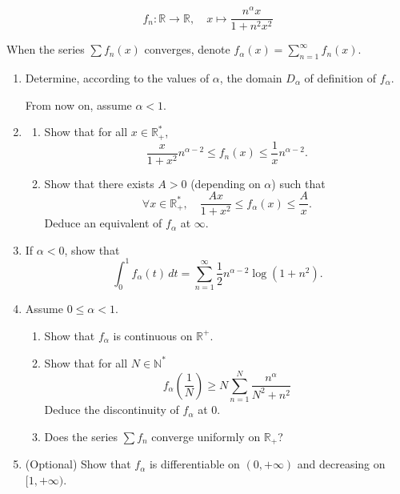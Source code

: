 \documentclass[12pt]{article}
\begin{document}
\[
f_n : \mathbb{R} \longrightarrow \mathbb{R}, \quad x \mapsto \frac{n^\alpha x}{1 + n^{2} x^2}
\]

When the series \( \sum f_n(x) \) converges, denote \( f_\alpha(x) = \sum_{n=1}^{\infty} f_n(x) \).

\begin{enumerate}
    \item Determine, according to the values of \( \alpha \), the domain \( D_\alpha \) of definition of \( f_\alpha \).
    
    From now on, assume \( \alpha < 1 \).
    
    \item 
    \begin{enumerate}
        \item Show that for all \( x \in \mathbb{R}_+^* \),
        \[
        \frac{x}{1+x^2} n^{\alpha-2}\leq f_n(x) \leq \frac{1}{x} n^{\alpha-2}.
        \]
        \item Show that there exists \( A > 0 \) (depending on \( \alpha \)) such that
        \[
        \forall x \in \mathbb{R}_+^*, \quad \frac{A x}{1+x^2} \leq f_\alpha(x) \leq \frac{A}{x}.
        \]
        Deduce an equivalent of \( f_\alpha \) at \( \infty \).
    \end{enumerate}
    
    \item If \( \alpha < 0 \), show that
    \[
    \int_0^1 f_\alpha(t) \, dt = \sum_{n=1}^{\infty} \frac{1}{2} n^{\alpha-2}\log(1+n^{2}).
    \]
    
    \item Assume \( 0 \leq \alpha < 1 \).
    \begin{enumerate}
        \item Show that \( f_\alpha \) is continuous on \( \mathbb{R}^+ \).
        
        \item Show that for all \( N \in \mathbb{N}^* \)
        \[
        f_{\alpha}\left(\frac{1}{N}\right) \ge N \sum_{n=1}^{N} \frac{n^{\alpha}}{N^2 + n^2}
        \]
        Deduce the discontinuity of \( f_\alpha \) at 0.
        
        \item Does the series \( \sum f_n \) converge uniformly on \( \mathbb{R}_+ \)?
    \end{enumerate}
    
    \item (Optional) Show that \( f_\alpha \) is differentiable on \( (0, +\infty) \) and decreasing on \( [1, +\infty) \).
\end{enumerate}
\end{document}
